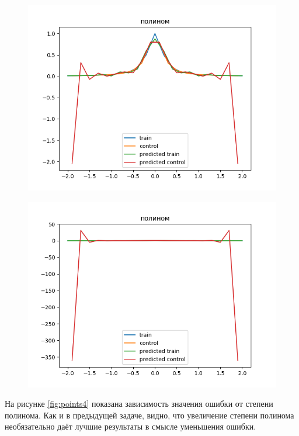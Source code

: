 \documentclass[12pt]{report}
\begin{document}
\begin{figure}[H!]
  \centering
  \includegraphics[width = \linewidth]{16.png}
  \caption{}
  \label{fig:16}
\end{figure}


\begin{figure}[H!]
  \centering
  \includegraphics[width = \linewidth]{20.png}
  \caption{}
  \label{fig:20}
\end{figure}


\newpage
На рисунке \ref{fig:points4} показана зависимость значения ошибки от степени полинома. Как и в предыдущей задаче, видно, что увеличение степени полинома необязательно даёт лучшие результаты в смысле уменьшения ошибки.
\end{document}
